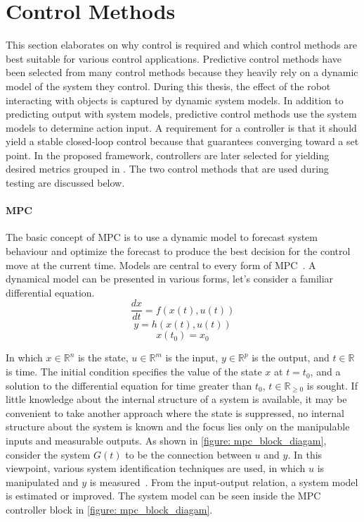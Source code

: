 \section{Control Methods}%
\label{sec:control_methods}
This section elaborates on why control is required and which control methods are best suitable for various control applications. Predictive control methods have been selected from many control methods because they heavily rely on a dynamic model of the system they control. During this thesis, the effect of the robot interacting with objects is captured by dynamic system models. In addition to predicting output with system models, predictive control methods use the system models to determine action input. A requirement for a controller is that it should yield a stable closed-loop control because that guarantees converging toward a set point. In the proposed framework, controllers are later selected for yielding desired metrics grouped in . The two control methods that are used during testing are discussed below.\bs

\paragraph{\acl{MPC}}
The basic concept of \ac{MPC} is to use a dynamic model to forecast system behaviour and optimize the forecast to produce the best decision for the control move at the current time. Models are central to every form of \ac{MPC}~\cite{rawlings_model_2020}. A dynamical model can be presented in various forms, let's consider a familiar differential equation.
$$ \frac{dx}{dt} = f(x(t), u(t)) $$
$$ y = h(x(t), u(t)) $$
$$ x(t_0) = x_0 $$

In which $x \in \mathbb{R}^n $ is the state, $u \in \mathbb{R}^m$ is the input, $y \in \mathbb{R}^p$ is the output, and $t \in \mathbb{R}$ is time. The initial condition specifies the value of the state $x$ at $t = t_0$, and a solution to the differential equation for time greater than $t_0$, $t \in \mathbb{R}_{\geq 0}$ is sought. If little knowledge about the internal structure of a system is available, it may be convenient to take another approach where the state is suppressed, no internal structure about the system is known and the focus lies only on the manipulable inputs and measurable outputs. As shown in \cref{figure: mpc_block_diagam}, consider the system $G(t)$ to be
the connection between $u$ and $y$. In this viewpoint, various system identification techniques are used, in which $u$ is manipulated and $y$ is measured~\cite{rawlings_model_2020}. From the input-output relation, a system model is estimated or improved. The system model can be seen inside the \ac{MPC} controller block in \cref{figure: mpc_block_diagam}.\\

